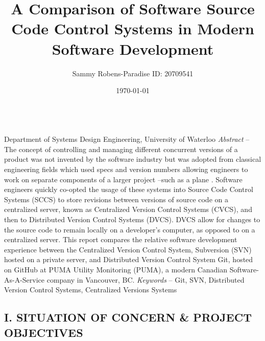 \documentclass{article}
\title{A Comparison of Software Source Code Control Systems in Modern Software Development}
\author{Sammy Robens-Paradise ID: 20709541}
\date{\today}
\begin{document}
\maketitle
{}\\
\centering
Department of Systems Design Engineering, University of Waterloo
\justify
\textit{Abstract} – The concept of controlling and managing different concurrent versions of a product was not invented by the software industry but was adopted from classical engineering fields which used specs and version numbers allowing engineers to work on separate components of a larger project –such as a plane \cite{history-of-version-control}. Software engineers quickly co-opted the usage of these systems into Source Code Control Systems (SCCS) to store revisions between versions of source code on a centralized server, known as Centralized Version Control Systems (CVCS), and then to Distributed Version Control Systems (DVCS). DVCS allow for changes to the source code to remain locally on a developer’s computer, as opposed to on a centralized server. This report compares the relative software development experience between the Centralized Version Control System, Subversion (SVN) hosted on a private server, and Distributed Version Control System Git, hosted on GitHub at PUMA Utility Monitoring (PUMA), a modern Canadian Software-As-A-Service company in Vancouver, BC.
\justify
\textit{Keywords} – Git, SVN, Distributed Version Control Systems, Centralized Versions Systems
\begin{center}
     \section*{I. SITUATION OF CONCERN \& PROJECT OBJECTIVES} 
\end{center}
\end{document}
